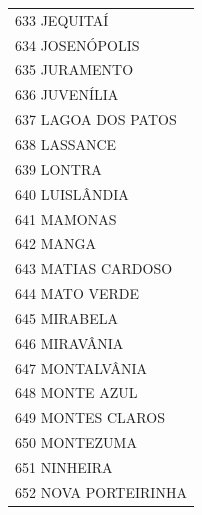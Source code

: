 \documentclass{article}
\begin{document}
\begin{longtable}[c]{m{18cm}}
\multicolumn{1}{l}{ \hspace{2em} 633 JEQUITAÍ } \\
\multicolumn{1}{l}{ \hspace{2em} 634 JOSENÓPOLIS } \\
\multicolumn{1}{l}{ \hspace{2em} 635 JURAMENTO } \\
\multicolumn{1}{l}{ \hspace{2em} 636 JUVENÍLIA } \\
\multicolumn{1}{l}{ \hspace{2em} 637 LAGOA DOS PATOS } \\
\multicolumn{1}{l}{ \hspace{2em} 638 LASSANCE } \\
\multicolumn{1}{l}{ \hspace{2em} 639 LONTRA } \\
\multicolumn{1}{l}{ \hspace{2em} 640 LUISLÂNDIA } \\
\multicolumn{1}{l}{ \hspace{2em} 641 MAMONAS } \\
\multicolumn{1}{l}{ \hspace{2em} 642 MANGA } \\
\multicolumn{1}{l}{ \hspace{2em} 643 MATIAS CARDOSO } \\
\multicolumn{1}{l}{ \hspace{2em} 644 MATO VERDE } \\
\multicolumn{1}{l}{ \hspace{2em} 645 MIRABELA } \\
\multicolumn{1}{l}{ \hspace{2em} 646 MIRAVÂNIA } \\
\multicolumn{1}{l}{ \hspace{2em} 647 MONTALVÂNIA } \\
\multicolumn{1}{l}{ \hspace{2em} 648 MONTE AZUL } \\
\multicolumn{1}{l}{ \hspace{2em} 649 MONTES CLAROS } \\
\multicolumn{1}{l}{ \hspace{2em} 650 MONTEZUMA } \\
\multicolumn{1}{l}{ \hspace{2em} 651 NINHEIRA } \\
\multicolumn{1}{l}{ \hspace{2em} 652 NOVA PORTEIRINHA } \\

\end{longtable}
\end{document}
